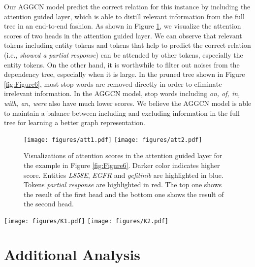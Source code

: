 \documentclass[11pt,a4paper]{article}
\begin{document}
Our AGGCN model predict the correct relation for this instance by including the attention guided layer, which is able to distill relevant information from the full tree in an end-to-end fashion. As shown in Figure \ref{fig:Figure5}, we visualize the attention scores of two heads in the attention guided layer. We can observe that relevant tokens including entity tokens and tokens that help to predict the correct relation (i.e., \textit{showed a partial  response}) can be attended by other tokens, especially the entity tokens. On the other hand, it is worthwhile to filter out noises from the dependency tree, especially when it is large. In the pruned tree shown in Figure \ref{fig:Figure6}, most stop words are removed directly in order to eliminate irrelevant information. In the AGGCN model, stop words including \textit{on, of, in, with, an, were} also have much lower scores. We believe the AGGCN model is able to maintain a balance between including and excluding information in the full tree for learning a better graph representation.

\begin{figure}
    \centering
    \texttt{[image: figures/att1.pdf]}
    \texttt{[image: figures/att2.pdf]}
    \caption{Visualizations of attention scores in the attention guided layer for the example in Figure \ref{fig:Figure6}. Darker color indicates higher score. Entities \textit{L858E}, \textit{EGFR} and \textit{gefitinib} are highlighted in blue. Tokens \textit{partial response} are highlighted in red. The top one shows the result of the first head and the bottom one shows the result of the second head.}
    \label{fig:Figure5}
\end{figure}


\begin{figure*}
    \centering
    \texttt{[image: figures/K1.pdf]}
    \texttt{[image: figures/K2.pdf]}
    \vspace{-2mm}
    \caption{Example dependency trees for two sentences expressing a relation (sensitivity) among three entities \textit{L858E}, \textit{EGFR} and \textit{gefitinib}. The top one shows the pruned tree when =0 (highlighted in bold). The bottom one shows the pruned tree when =1 (highlighted in bold). Tokens \textit{partial response} are off these two paths.}
\label{fig:Figure6}
\end{figure*}

\section{Additional Analysis}
\label{sec:7}
\end{document}
